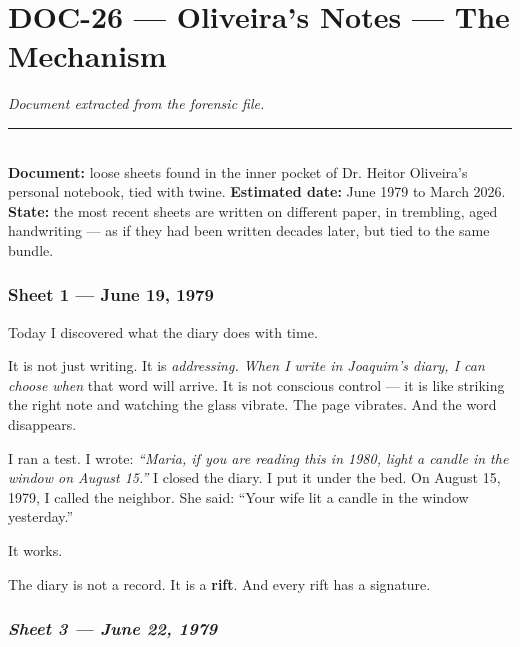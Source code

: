 \section*{\textbf{DOC-26} --- Oliveira's Notes --- The Mechanism}

\noindent \textit{Document extracted from the forensic file.}

\vspace{0.5em}\noindent\rule{\textwidth}{0.5pt}\vspace{0.5em}

\\[-0.2em]

\noindent\textbf{Document:} loose sheets found in the inner pocket of Dr. Heitor Oliveira's personal notebook, tied with twine. \textbf{Estimated date:} June 1979 to March 2026. \textbf{State:} the most recent sheets are written on different paper, in trembling, aged handwriting --- as if they had been written decades later, but tied to the same bundle.

\subsubsection*{Sheet 1 --- June 19, 1979}

\noindent Today I discovered what the diary does with time.

\noindent It is not just writing. It is \textit{addressing\textit{. When I write in Joaquim's diary, I can choose }when} that word will arrive. It is not conscious control --- it is like striking the right note and watching the glass vibrate. The page vibrates. And the word disappears.

\noindent I ran a test. I wrote: \textit{\textquotedblleft{}Maria, if you are reading this in 1980, light a candle in the window on August 15.\textquotedblright{}} I closed the diary. I put it under the bed. On August 15, 1979, I called the neighbor. She said: \textquotedblleft{}Your wife lit a candle in the window yesterday.\textquotedblright{}

\noindent It works.

\noindent The diary is not a record. It is a \textbf{rift}. And every rift has a signature.

\subsubsection*{\textit{Sheet 3 --- June 22, 1979}}

